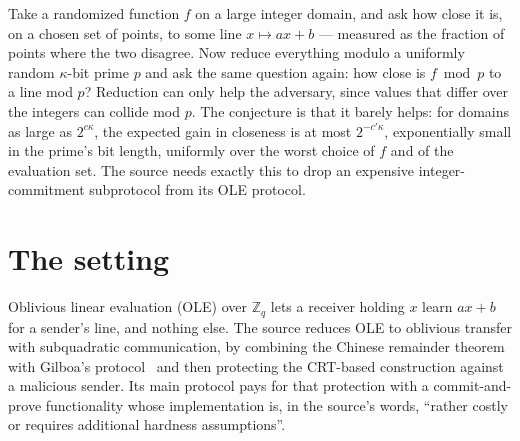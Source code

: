 \documentclass{conjura-conjecture}
\begin{document}

\vspace{0.4em}

\begin{informalconjecture}
Take a randomized function $f$ on a large integer domain, and ask how
close it is, on a chosen set of points, to some line $x \mapsto ax + b$
--- measured as the fraction of points where the two disagree. Now
reduce everything modulo a uniformly random $\kappa$-bit prime $p$ and
ask the same question again: how close is $f \bmod p$ to a line mod $p$?
Reduction can only help the adversary, since values that differ over the
integers can collide mod $p$. The conjecture is that it barely helps: for
domains as large as $2^{c \kappa}$, the expected gain in closeness is at
most $2^{-c' \kappa}$, exponentially small in the prime's bit length,
uniformly over the worst choice of $f$ and of the evaluation set. The
source needs exactly this to drop an expensive integer-commitment
subprotocol from its OLE protocol.
\end{informalconjecture}

\section{The setting}\label{sec:setting}

Oblivious linear evaluation (OLE) over $\mathbb{Z}_{q}$ lets a receiver
holding $x$ learn $ax + b$ for a sender's line, and nothing else. The
source reduces OLE to oblivious transfer with subquadratic
communication, by combining the Chinese remainder theorem with Gilboa's
protocol~\cite{Gil99} and then protecting the CRT-based construction
against a malicious sender. Its main protocol pays for that protection
with a commit-and-prove functionality whose implementation is, in the
source's words, ``rather costly or requires additional hardness
assumptions''.
\end{document}
